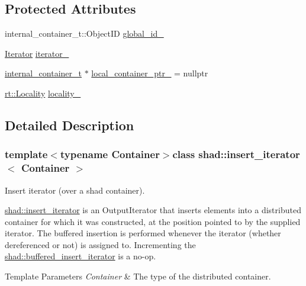 \subsection*{Protected Attributes}
\begin{DoxyCompactItemize}
\item 
internal\-\_\-container\-\_\-t\-::\-Object\-I\-D \hyperlink{classshad_1_1insert__iterator_ab90ac3bffe8239a3d5472ad669164597}{global\-\_\-id\-\_\-}
\item 
\hyperlink{classshad_1_1insert__iterator_a9423151fee020bc148d8c6037ecb0542}{Iterator} \hyperlink{classshad_1_1insert__iterator_a0d26bcdf8d5485fd5a703245bb9d75a5}{iterator\-\_\-}
\item 
\hyperlink{classshad_1_1insert__iterator_a040650a6a725c67ff6b4331cef06afaa}{internal\-\_\-container\-\_\-t} $\ast$ \hyperlink{classshad_1_1insert__iterator_ab1fb4edf1ef845937bf22731526c2b9e}{local\-\_\-container\-\_\-ptr\-\_\-} = nullptr
\item 
\hyperlink{classshad_1_1rt_1_1Locality}{rt\-::\-Locality} \hyperlink{classshad_1_1insert__iterator_a5b9dc5f15bd6d1aa377a9befe7f14ae5}{locality\-\_\-}
\end{DoxyCompactItemize}


\subsection{Detailed Description}
\subsubsection*{template$<$typename Container$>$class shad\-::insert\-\_\-iterator$<$ Container $>$}

Insert iterator (over a shad container). 

\hyperlink{classshad_1_1insert__iterator}{shad\-::insert\-\_\-iterator} is an Output\-Iterator that inserts elements into a distributed container for which it was constructed, at the position pointed to by the supplied iterator. The buffered insertion is performed whenever the iterator (whether dereferenced or not) is assigned to. Incrementing the \hyperlink{classshad_1_1buffered__insert__iterator}{shad\-::buffered\-\_\-insert\-\_\-iterator} is a no-\/op.


\begin{DoxyTemplParams}{Template Parameters}
{\em Container} & The type of the distributed container. \\
\hline
\end{DoxyTemplParams}


